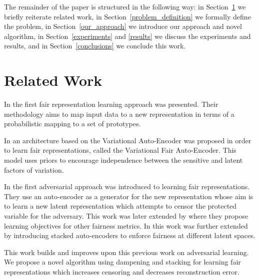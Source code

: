 \documentclass[nohyperref]{article}
\theoremstyle{plain}
\theoremstyle{definition}
\theoremstyle{remark}
\begin{document}
The remainder of the paper is structured in the following way: in Section~\ref{related_work} we briefly reiterate related work, in Section~\ref{problem_definition} we formally define the problem, in Section~\ref{our_approach} we introduce our approach and novel algorithm, in Section~\ref{experiments} and \ref{results} we discuss the experiments and results, and in Section~\ref{conclusions} we conclude this work.
\section{Related Work}
\label{related_work}
In \cite{pmlr-v28-zemel13} the first fair representation learning approach was presented. Their methodology aims to map input data to a new representation in terms of a probabilistic mapping to a set of prototypes. 

In \cite{DBLP:journals/corr/LouizosSLWZ15} an architecture based on the Variational Auto-Encoder was proposed in order to learn fair representations, called the Variational Fair Auto-Encoder. This model uses priors to encourage independence between the sensitive and latent factors of variation.

In \cite{edwards2016censoring} the first adversarial approach was introduced to learning fair representations. They use an auto-encoder as a generator for the new representation whose aim is to learn a new latent representation which attempts to censor the protected variable for the adversary. This work was later extended by  \cite{pmlr-v80-madras18a} where they propose learning objectives for other fairness metrics. In \cite{kenfack2021adversarial} this work was further extended by introducing stacked auto-encoders to enforce fairness at different latent spaces.

This work builds and improves upon this previous work on adversarial learning. We propose a novel algorithm using dampening and stacking for learning fair representations which increases censoring and decreases reconstruction error. 
\end{document}
